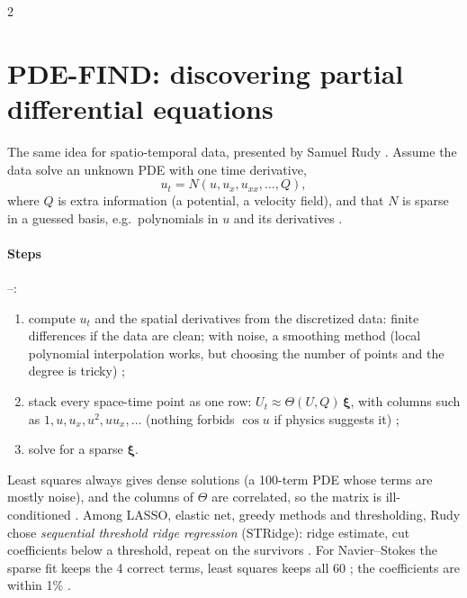 \begin{paracol}{2}
\section{PDE-FIND: discovering partial differential equations}\label{sec:si-pdefind}

The same idea for spatio-temporal data, presented by Samuel Rudy . Assume the data solve an
unknown PDE with one time derivative,
\begin{equation}\label{eq:si-pde}
  u_t=N(u,u_x,u_{xx},\dots,Q),
\end{equation}
where $Q$ is extra information (a potential, a velocity field), and that $N$ is sparse in a guessed basis,
e.g.\ polynomials in $u$ and its derivatives .

\paragraph{Steps} --:
\begin{enumerate}
  \item compute $u_t$ and the spatial derivatives from the discretized data: finite differences if the
        data are clean; with noise, a smoothing method (local polynomial interpolation works, but choosing
        the number of points and the degree is tricky) ;
  \item stack every space-time point as one row: $U_t\approx\Theta(U,Q)\,\boldsymbol\xi$, with columns
        such as $1,u,u_x,u^2,uu_x,\dots$ (nothing forbids $\cos u$ if physics suggests it)
        ;
  \item solve for a sparse $\boldsymbol\xi$.
\end{enumerate}
Least squares always gives dense solutions (a 100-term PDE whose terms are mostly noise), and the
columns of $\Theta$ are correlated, so the matrix is ill-conditioned .
Among LASSO, elastic net, greedy methods and thresholding, Rudy chose \emph{sequential threshold ridge
regression} (STRidge): ridge estimate, cut coefficients below a threshold, repeat on the survivors
. For Navier--Stokes the sparse fit keeps the 4 correct terms, least squares
keeps all 60 ; the coefficients are within 1\% .



\end{paracol}
